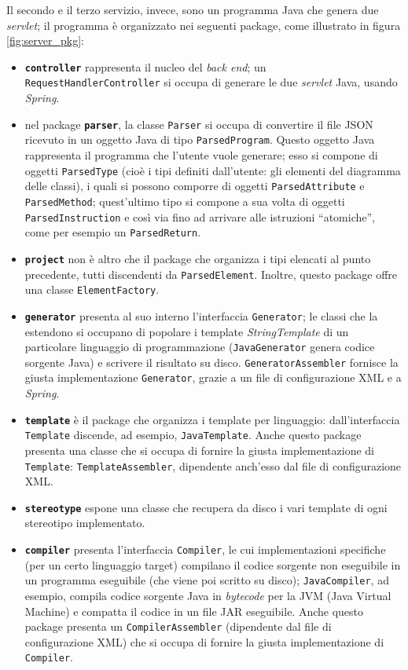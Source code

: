 Il secondo e il terzo servizio, invece, sono un programma Java che genera due \emph{servlet}; il programma è organizzato nei seguenti package, come illustrato in figura \ref{fig:server_pkg}:
\begin{itemize}
	\item \textbf{\texttt{controller}} rappresenta il nucleo del \emph{back end}; un \texttt{RequestHandlerController} si occupa di generare le due \emph{servlet} Java, usando \emph{Spring}.
	\item nel package \textbf{\texttt{parser}}, la classe \texttt{Parser} si occupa di convertire il file JSON ricevuto in un oggetto Java di tipo \texttt{ParsedProgram}. Questo oggetto Java rappresenta il programma che l'utente vuole generare; esso si compone di oggetti \texttt{ParsedType} (cioè i tipi definiti dall'utente: gli elementi del diagramma delle classi), i quali si possono comporre di oggetti \texttt{ParsedAttribute} e \texttt{ParsedMethod}; quest'ultimo tipo si compone a sua volta di oggetti \texttt{ParsedInstruction} e così via fino ad arrivare alle istruzioni “atomiche”, come per esempio un \texttt{ParsedReturn}.
	\item \textbf{\texttt{project}} non è altro che il package che organizza i tipi elencati al punto precedente, tutti discendenti da \texttt{ParsedElement}. Inoltre, questo package offre una classe \texttt{ElementFactory}. %
	\item \textbf{\texttt{generator}} presenta al suo interno l'interfaccia \texttt{Generator}; le classi che la estendono si occupano di popolare i template \emph{StringTemplate} di un particolare linguaggio di programmazione (\texttt{JavaGenerator} genera codice sorgente Java) e scrivere il risultato su disco. \texttt{GeneratorAssembler} fornisce la giusta implementazione \texttt{Generator}, grazie a un file di configurazione XML e a \emph{Spring}.
	\item \textbf{\texttt{template}} è il package che organizza i template per linguaggio: dall'interfaccia \texttt{Template} discende, ad esempio, \texttt{JavaTemplate}. Anche questo package presenta una classe che si occupa di fornire la giusta implementazione di \texttt{Template}: \texttt{TemplateAssembler}, dipendente anch'esso dal file di configurazione XML.
	\item \textbf{\texttt{stereotype}} espone una classe che recupera da disco i vari template di ogni stereotipo implementato.
	\item \textbf{\texttt{compiler}} presenta l'interfaccia \texttt{Compiler}, le cui implementazioni specifiche (per un certo linguaggio target) compilano il codice sorgente non eseguibile in un programma eseguibile (che viene poi scritto su disco); \texttt{JavaCompiler}, ad esempio, compila codice sorgente Java in \emph{bytecode} per la JVM (Java Virtual Machine) e compatta il codice in un file JAR eseguibile. Anche questo package presenta un \texttt{CompilerAssembler} (dipendente dal file di configurazione XML) che si occupa di fornire la giusta implementazione di \texttt{Compiler}.

\end{itemize}
